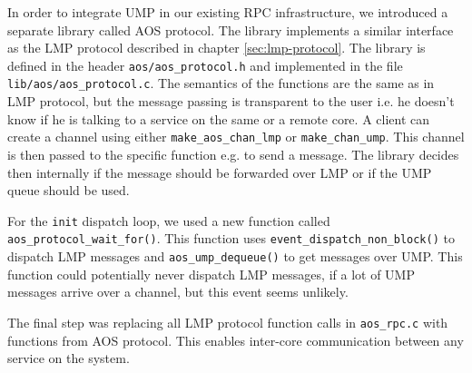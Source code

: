 In order to integrate UMP in our existing RPC infrastructure, we introduced a separate
library called AOS protocol. The library implements a similar interface as the LMP protocol
described in chapter \ref{sec:lmp-protocol}. The library is defined in the header 
\verb|aos/aos_protocol.h| and implemented in the file \verb|lib/aos/aos_protocol.c|. The semantics
of the functions are the same as in LMP protocol, but the message passing is transparent to the user
i.e. he doesn't know if he is talking to a service on the same or a remote core. A client can create
a channel using either \verb|make_aos_chan_lmp| or \verb|make_chan_ump|. This channel is then passed
to the specific function e.g. to send a message. The library decides then internally if the message
should be forwarded over LMP or if the UMP queue should be used.

For the \verb|init| dispatch loop, we used a new function called \verb|aos_protocol_wait_for()|. This
function uses \verb|event_dispatch_non_block()| to dispatch LMP messages and \verb|aos_ump_dequeue()|
to get messages over UMP. This function could potentially never dispatch LMP messages, if a lot of UMP
messages arrive over a channel, but this event seems unlikely.

The final step was replacing all LMP protocol function calls in \verb|aos_rpc.c| with functions from
AOS protocol. This enables inter-core communication between any service on the system.

